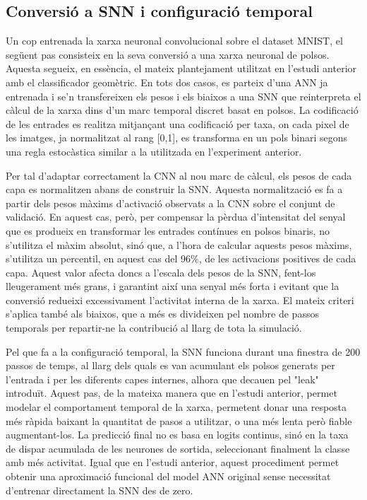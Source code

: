 \documentclass[a4paper,11pt, titlepage, twoside]{article}
\begin{document}
\subsection{Conversió a SNN i configuració temporal}
Un cop entrenada la xarxa neuronal convolucional sobre el dataset MNIST, el següent pas consisteix en la seva conversió a una xarxa neuronal de polsos. Aquesta segueix, en essència, el mateix plantejament utilitzat en l'estudi anterior amb el classificador geomètric. En tots dos casos, es parteix d'una ANN ja entrenada i se'n transfereixen els pesos i els biaixos a una SNN que reinterpreta el càlcul de la xarxa dins d'un marc temporal discret basat en polsos. La codificació de les entrades es realitza mitjançant una codificació per taxa, on cada pixel de les imatges, ja normalitzat al rang [0,1], es transforma en un pols binari segons una regla estocàstica similar a la utilitzada en l'experiment anterior.

Per tal d'adaptar correctament la CNN al nou marc de càlcul, els pesos de cada capa es normalitzen abans de construir la SNN. Aquesta normalització es fa a partir dels pesos màxims d'activació observats a la CNN sobre el conjunt de validació. En aquest cas, però, per compensar la pèrdua d'intensitat del senyal que es produeix en transformar les entrades contínues en polsos binaris, no s'utilitza el màxim absolut, sinó que, a l'hora de calcular aquests pesos màxims, s'utilitza un percentil, en aquest cas del 96\%, de les activacions positives de cada capa. Aquest valor afecta doncs a l'escala dels pesos de la SNN, fent-los lleugerament més grans, i garantint així una senyal més forta i evitant que la conversió redueixi excessivament l'activitat interna de la xarxa. El mateix criteri s'aplica també als biaixos, que a més es divideixen pel nombre de passos temporals per repartir-ne la contribució al llarg de tota la simulació.

Pel que fa a la configuració temporal, la SNN funciona durant una finestra de 200 passos de temps, al llarg dels quals es van acumulant els polsos generats per l'entrada i per les diferents capes internes, alhora que decauen pel "leak" introduït. Aquest pas, de la mateixa manera que en l'estudi anterior, permet modelar el comportament temporal de la xarxa, permetent donar una resposta més ràpida baixant la quantitat de pasos a utilitzar, o una més lenta però fiable augmentant-los. La predicció final no es basa en logits continus, sinó en la taxa de dispar acumulada de les neurones de sortida, seleccionant finalment la classe amb més activitat. Igual que en l'estudi anterior, aquest procediment permet obtenir una aproximació funcional del model ANN original sense necessitat d'entrenar directament la SNN des de zero.
\end{document}
